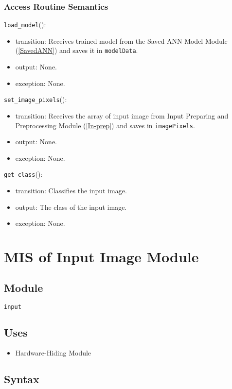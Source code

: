 \documentclass[12pt, titlepage]{article}
\def\code#1{\texttt{#1}}
\begin{document}
\subsubsection{Access Routine Semantics}

\noindent \code{load\_model}():
\begin{itemize}
  \item transition: Receives trained model from the Saved ANN Model Module (\ref{SavedANN}) 
  and saves it in \code{modelData}.
  \item output: None.
  \item exception: None.
\end{itemize}

\noindent \code{set\_image\_pixels}():
\begin{itemize}
  \item transition: Receives the array of input image from Input Preparing and Preprocessing Module (\ref{In-prep}) 
  and saves in \code{imagePixels}.
  \item output: None.
  \item exception: None.
\end{itemize}

\noindent \code{get\_class}():
\begin{itemize}
  \item transition: Classifies the input image.
  \item output: The class of the input image.
  \item exception: None.
\end{itemize}

\section{MIS of Input Image Module} \label{In-set} 

\subsection{Module}
\code{input} 

\subsection{Uses}
\begin{itemize}
  \item Hardware-Hiding Module  
\end{itemize}


\subsection{Syntax}
\end{document}
